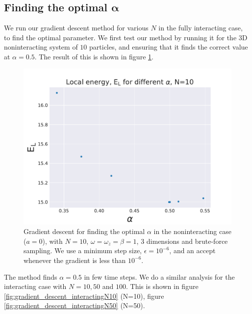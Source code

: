 \documentclass[a4paper, 10pt]{article}
\begin{document}
	\subsection{Finding the optimal $\boldsymbol{\alpha}$}
	We run our gradient descent method for various $N$ in the fully interacting case, to find the optimal parameter. We first test our method by running it for the 3D noninteracting system of $10$ particles, and ensuring that it finds the correct value at $\alpha=0.5$. The result of this is shown in figure \ref{fig:gradient_descent_noninteracting}.
			\begin{figure}[ht!]
				\centering
				\includegraphics[scale=0.8]{../Results/E_v_alpha_gradient_noninteracting.pdf}
				\caption{Gradient descent for finding the optimal $\alpha$ in the noninteracting case ($a=0$), with $N=10$, $\omega=\omega_z=\beta=1$, 3 dimensions and brute-force sampling. We use a minimum step size, $\epsilon=10^{-6}$, and an accept whenever the gradient is less than $10^{-6}$.}\label{fig:gradient_descent_noninteracting}
			\end{figure}
	The method finds $\alpha=0.5$ in few time steps. We do a similar analysis for the interacting case with $N=10,50$ and $100$. This is shown in figure \ref{fig:gradient_descent_interactingN10} (N=10), figure \ref{fig:gradient_descent_interactingN50} (N=50).
\end{document}
